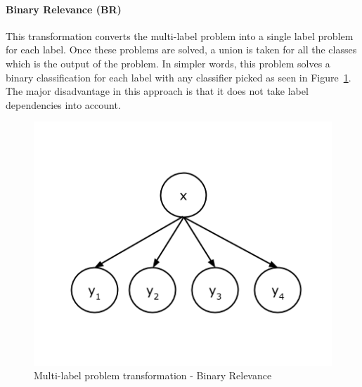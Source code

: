 \paragraph{Binary Relevance (BR)} 
This transformation converts the multi-label problem into a single label problem for each label. Once these problems are solved, a union is taken for all the classes which is the output of the problem. In simpler words, this problem solves a binary classification for each label with any classifier picked as seen in Figure~\ref{fig:BR}. The major disadvantage in this approach is that it does not take label dependencies into account. 
\begin{figure}[!htb]
    \centering
    \includegraphics[scale=0.5]{Figures/BinaryRelevance.png}
    \caption{Multi-label problem transformation - Binary Relevance}
    \label{fig:BR}
\end{figure}

